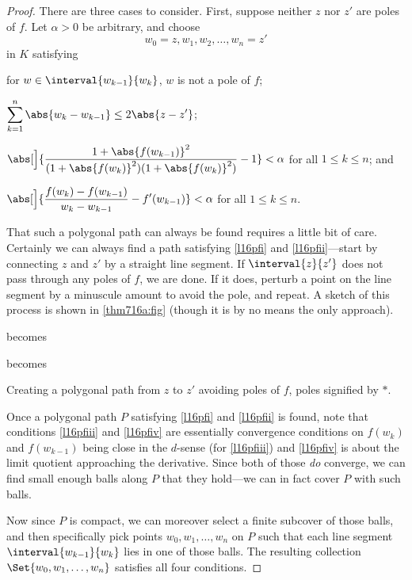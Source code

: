 \begin{proof}
	There are three cases to consider.
	First, suppose neither $z$ nor $z'$ are poles of $f$.
	Let $\alpha > 0$ be arbitrary, and choose
	\[
		w_0 = z, w_1, w_2, \dots, w_n = z'
	\]
	in $K$ satisfying
	\begin{items}
		\item\label{l16pfi} for $w \in \interval{w_{k - 1}}{w_k}$, $w$ is not a pole of $f$;
		\item\label{l16pfii} $\displaystyle \sum_{k = 1}^n \abs{w_k - w_{k - 1}} \leq 2 \abs{z - z'}$;
		\item\label{l16pfiii} $\displaystyle \abs[\Big]{ \frac{1 + \abs{f(w_{k - 1})}^2}{(1 + \abs{f(w_k)}^2) (1 + \abs{f(w_k)}^2)} - 1 } < \alpha$ for all $1 \leq k \leq n$; and
		\item\label{l16pfiv} $\displaystyle \abs[\Big]{ \frac{f(w_k) - f(w_{k - 1})}{w_k - w_{k - 1}} - f'(w_{k - 1})} < \alpha$ for all $1 \leq k \leq n$.
	\end{items}

	That such a polygonal path can always be found requires a little bit of care.
	Certainly we can always find a path satisfying \ref{l16pfi} and \ref{l16pfii}---start by connecting $z$ and $z'$ by a straight line segment.
	If $\interval{z}{z'}$ does not pass through any poles of $f$, we are done.
	If it does, perturb a point on the line segment by a minuscule amount to avoid the pole, and repeat.
	A sketch of this process is shown in \autoref{thm716a:fig} (though it is by no means the only approach).

	\begin{marginfigure}
		\centering

		becomes


		becomes


		\caption{\label{thm716a:fig} Creating a polygonal path from $z$ to $z'$ avoiding poles of $f$, poles signified by $*$.}
	\end{marginfigure}

	Once a polygonal path $P$ satisfying \ref{l16pfi} and \ref{l16pfii} is found, note that conditions \ref{l16pfiii} and \ref{l16pfiv} are essentially convergence conditions on $f(w_{k})$ and $f(w_{k - 1})$ being close in the $d$-sense (for \ref{l16pfiii}) and \ref{l16pfiv} is about the limit quotient approaching the derivative.
	Since both of those \emph{do} converge, we can find small enough balls along $P$ that they hold---we can in fact cover $P$ with such balls.

	Now since $P$ is compact, we can moreover select a finite subcover of those balls, and then specifically pick points $w_0, w_1, \dots, w_n$ on $P$ such that each line segment $\interval{w_{k - 1}}{w_k}$ lies in one of those balls.
	The resulting collection $\Set{w_0, w_1, \dots, w_n}$ satisfies all four conditions. \renewcommand{\qedsymbol}{}
\end{proof}

